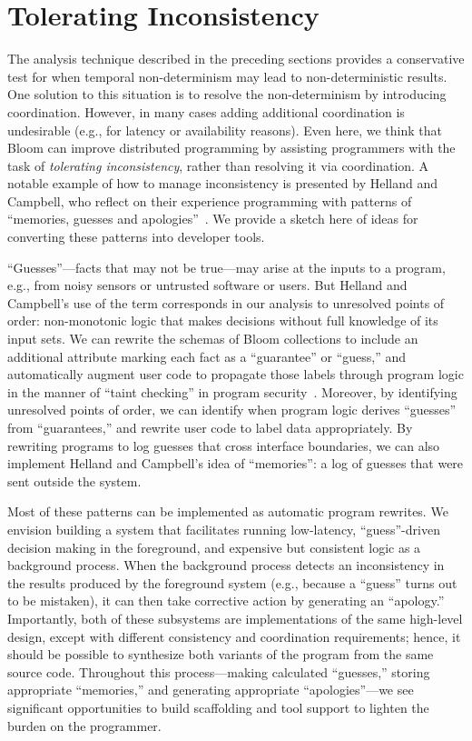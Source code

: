 \section{Tolerating Inconsistency}
\label{sec:inconsistency}
The analysis technique described in the preceding sections provides a
conservative test for when temporal non-determinism may lead to
non-deterministic results. One solution to this situation is to resolve the
non-determinism by introducing coordination. However, in many cases adding
additional coordination is undesirable (e.g., for latency or availability
reasons). Even here, we think that Bloom can improve distributed programming by
assisting programmers with the task of \emph{tolerating inconsistency}, rather
than resolving it via coordination.  A notable example of how to manage
inconsistency is presented by Helland and Campbell, who reflect on their
experience programming with patterns of ``memories, guesses and
apologies''~\cite{quicksand}.  We provide a sketch here of ideas for converting
these patterns into developer tools.

``Guesses''---facts that may not be true---may arise at the inputs to a program,
e.g., from noisy sensors or untrusted software or users.  But Helland and
Campbell's use of the term corresponds in our analysis to unresolved points of
order: non-monotonic logic that makes decisions without full knowledge of its
input sets.  We can rewrite the schemas of Bloom collections to include an
additional attribute marking each fact as a ``guarantee'' or ``guess,'' and
automatically augment user code to propagate those labels through program logic
in the manner of ``taint checking'' in program security~\cite{taint,asbestos}.
Moreover, by identifying unresolved points of order, we can identify when
program logic derives ``guesses'' from ``guarantees,'' and rewrite user code to
label data appropriately. By rewriting programs to log guesses that cross
interface boundaries, we can also implement Helland and Campbell's idea of
``memories'': a log of guesses that were sent outside the system.

Most of these patterns can be implemented as automatic program rewrites. We
envision building a system that facilitates running low-latency,
``guess''-driven decision making in the foreground, and expensive but consistent
logic as a background process. When the background process detects an
inconsistency in the results produced by the foreground system (e.g., because a
``guess'' turns out to be mistaken), it can then take corrective action by
generating an ``apology.'' Importantly, both of these subsystems are
implementations of the same high-level design, except with different consistency
and coordination requirements; hence, it should be possible to synthesize both
variants of the program from the same source code. Throughout this
process---making calculated ``guesses,'' storing appropriate ``memories,'' and
generating appropriate ``apologies''---we see significant opportunities to build
scaffolding and tool support to lighten the burden on the programmer.

